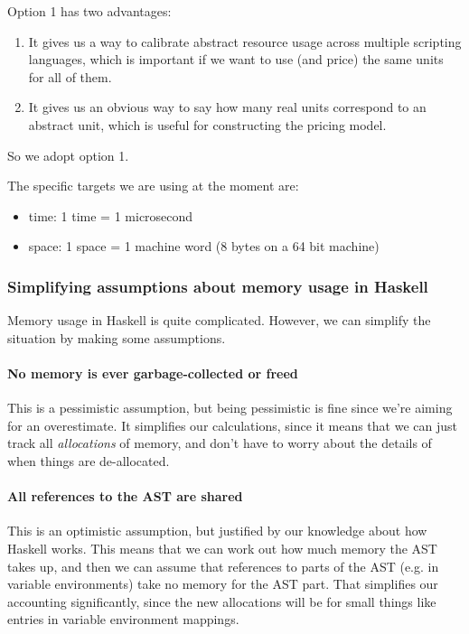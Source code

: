 Option 1 has two advantages:
\begin{enumerate}
\item It gives us a way to calibrate abstract resource usage across multiple scripting languages, which is important if we want to use (and price) the same units for all of them.
\item It gives us an obvious way to say how many real units correspond to an abstract unit, which is useful for constructing the pricing model.
\end{enumerate}

So we adopt option 1.

The specific targets we are using at the moment are:
\begin{itemize}
\item \gls{time}: 1 \gls{time} = 1 microsecond
\item \gls{space}: 1 \gls{space} = 1 machine word (8 bytes on a 64 bit machine)
\end{itemize}

\subsubsection{Simplifying assumptions about memory usage in Haskell}
Memory usage in Haskell is quite complicated.
However, we can simplify the situation by making some assumptions.

\paragraph{No memory is ever garbage-collected or freed}
This is a pessimistic assumption, but being pessimistic is fine since we're aiming for an overestimate.
It simplifies our calculations, since it means that we can just track all \emph{allocations} of memory, and don't have to worry about the details of when things are de-allocated.

\paragraph{All references to the AST are shared}
This is an optimistic assumption, but justified by our knowledge about how Haskell works.
This means that we can work out how much memory the AST takes up, and then we can assume that references to parts of the AST (e.g. in variable environments) take no memory for the AST part.
That simplifies our accounting significantly, since the new allocations will be for small things like entries in variable environment mappings.

